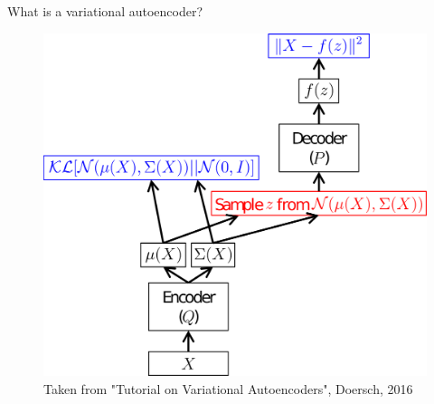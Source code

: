 \documentclass[10pt,aspectratio=169]{beamer}
\begin{document}
\begin{frame}{What is a variational autoencoder?}
	\begin{center}
            \begin{figure}
                \includegraphics[height=.8\textheight]{figs/net.png}
                \caption{Taken from "Tutorial on Variational Autoencoders", Doersch, 2016}
            \end{figure}
	\end{center}
\end{frame}
\end{document}
